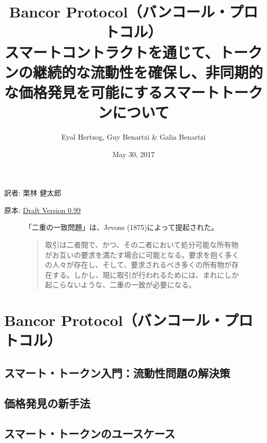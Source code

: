 \documentclass{jsarticle}
\begin{document}
\title{
  Bancor Protocol（バンコール・プロトコル） \\
  \large
  スマートコントラクトを通じて、トークンの継続的な流動性を確保し、非同期的な価格発見を可能にするスマートトークンについて
}

\author{Eyal Hertzog, Guy Benartzi \& Galia Benartzi}
\date{May 30, 2017}

\maketitle

\begin{center}
  \item[訳者:] 栗林 健太郎
  \item[原本:] \href{http://www.hyuki.com/girl/}{Draft Version 0.99}
\end{center}

\begin{figure}[b]
  「二重の一致問題」は、Jevons (1875)によって提起された。

  \begin{quotation}  
    取引は二者間で、かつ、その二者において処分可能な所有物がお互いの要求を満たす場合に可能となる。要求を抱く多くの人々が存在し、そして、要求されるべき多くの所有物が存在する。しかし、現に取引が行われるためには、まれにしか起こらないような、二重の一致が必要になる。
  \end{quotation}
\end{figure}

\newpage
\tableofcontents
\newpage

\section{Bancor Protocol（バンコール・プロトコル）}



  \subsection{スマート・トークン入門：流動性問題の解決策}



  \subsection{価格発見の新手法}



  \subsection{スマート・トークンのユースケース}
\end{document}

